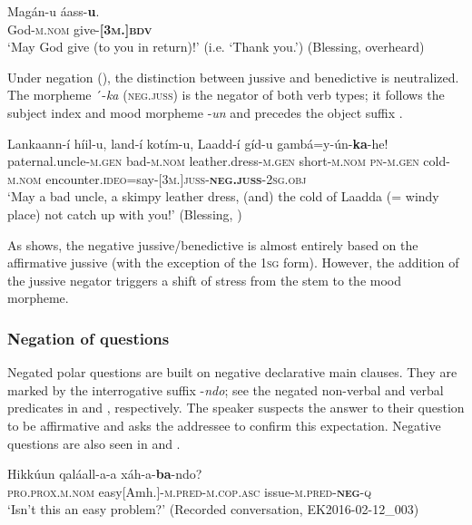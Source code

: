 \documentclass[output=paper,colorlinks,citecolor=brown,draftmode
]{langscibook}
\begin{document}
\ea\label{ex:treis:add7}
\gll Magán-u áass-\textbf{u}.\\
God-\textsc{m.nom} give-\textbf{\textsc{[3m.]bdv}}\\
\glt ‘May God give (to you in return)!' (i.e. ‘Thank you.')  (Blessing, overheard)
\z

Under negation (), the distinction between jussive and benedictive is neutralized. The morpheme ´-\textit{ka} (\textsc{neg.juss}) is the negator of both verb types; it follows the subject index and mood morpheme -\textit{un} and precedes the object suffix .
 
\ea\label{ex:treis:7} 
\gll Lankaann-í					híil-u, 			land-í						kotím-u, Laadd-í		gíd-u				gambá=y-ún-\textbf{ka}-he!\\
paternal.uncle-\textsc{m.gen}	bad-\textsc{m.nom}	leather.dress-\textsc{m.gen}	short-\textsc{m.nom} \textsc{pn-m.gen}	cold-\textsc{m.nom}	encounter.\textsc{ideo}=say-[\textsc{3m}.]\textsc{juss-\textbf{neg.juss}-2sg.obj}\\
\glt ‘May a bad uncle, a skimpy leather dress, (and) the cold of Laadda (= windy place) not catch up with you!’ (Blessing, \citealt[101]{AlamuAlamaayyo2017})
\z

As  shows, the negative jussive/benedictive is almost entirely based on the affirmative jussive (with the exception of the \textsc{1sg} form). However, the addition of the jussive negator triggers a shift of stress from the stem to the mood morpheme.

\subsubsection{Negation of questions}\label{sec:treis:2.2.3}

Negated polar questions are built on negative declarative main clauses. They are marked by the interrogative suffix -\textit{ndo}; see the negated non-verbal and verbal predicates in  and , respectively. The speaker suspects the answer to their question to be affirmative and asks the addressee to confirm this expectation. Negative questions are also seen in  and .

\ea\label{ex:treis:8} 
\gll Hikkúun 				qaláall-a-a 						xáh-a-\textbf{ba}-ndo?\\
\textsc{pro.prox.m.nom}	easy[Amh.]-\textsc{m.pred-m.cop.asc}	issue-\textsc{m.pred-\textbf{neg}-q}\\ 
\glt ‘Isn’t this an easy problem?’ (Recorded conversation, EK2016-02-12\_003)
\z 
\end{document}
